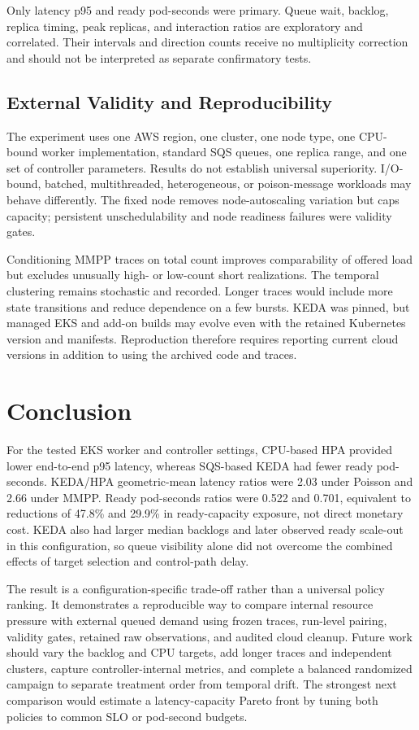 \documentclass[conference]{IEEEtran}
\begin{document}
Only latency p95 and ready pod-seconds were primary. Queue wait, backlog,
replica timing, peak replicas, and interaction ratios are exploratory and
correlated. Their intervals and direction counts receive no multiplicity
correction and should not be interpreted as separate confirmatory tests.

\subsection{External Validity and Reproducibility}

The experiment uses one AWS region, one cluster, one node type, one CPU-bound
worker implementation, standard SQS queues, one replica range, and one set of
controller parameters. Results do not establish universal superiority. I/O-bound,
batched, multithreaded, heterogeneous, or poison-message workloads may behave
differently. The fixed node removes node-autoscaling variation but caps capacity;
persistent unschedulability and node readiness failures were validity gates.

Conditioning MMPP traces on total count improves comparability of offered load
but excludes unusually high- or low-count short realizations. The temporal
clustering remains stochastic and recorded. Longer traces would include more
state transitions and reduce dependence on a few bursts. KEDA was pinned, but
managed EKS and add-on builds may evolve even with the retained Kubernetes
version and manifests. Reproduction therefore requires reporting current cloud
versions in addition to using the archived code and traces.

\section{Conclusion}

For the tested EKS worker and controller settings, CPU-based HPA provided lower
end-to-end p95 latency, whereas SQS-based KEDA had fewer ready pod-seconds.
KEDA/HPA geometric-mean latency ratios were 2.03 under Poisson and 2.66 under
MMPP. Ready pod-seconds ratios were 0.522 and 0.701, equivalent to reductions of
47.8\% and 29.9\% in ready-capacity exposure, not direct monetary cost. KEDA
also had larger median backlogs and later observed ready scale-out in this
configuration, so queue visibility alone did not overcome the combined effects
of target selection and control-path delay.

The result is a configuration-specific trade-off rather than a universal policy
ranking. It demonstrates a reproducible way to compare internal resource
pressure with external queued demand using frozen traces, run-level pairing,
validity gates, retained raw observations, and audited cloud cleanup. Future
work should vary the backlog and CPU targets, add longer traces and independent
clusters, capture controller-internal metrics, and complete a balanced randomized
campaign to separate treatment order from temporal drift. The strongest next
comparison would estimate a latency-capacity Pareto front by tuning both policies
to common SLO or pod-second budgets.



\end{document}
